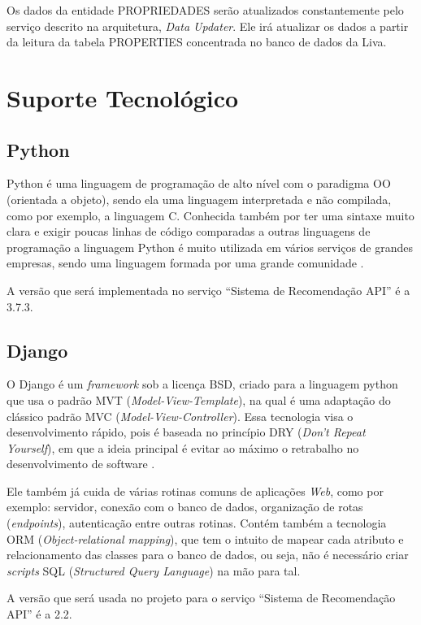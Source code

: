 Os dados da entidade PROPRIEDADES serão atualizados constantemente pelo serviço descrito na arquitetura, \textit{Data Updater}. Ele irá atualizar os dados a partir da leitura da tabela PROPERTIES concentrada no banco de dados da Liva.

\section{Suporte Tecnológico}

\subsection{Python}

Python é uma linguagem de programação de alto nível com o paradigma OO (orientada a objeto), sendo ela uma linguagem interpretada e não compilada, como por exemplo, a linguagem C. Conhecida também por ter uma sintaxe muito clara e exigir poucas linhas de código comparadas a outras linguagens de programação a linguagem Python é muito utilizada em vários serviços de grandes empresas, sendo uma linguagem formada por uma grande comunidade \cite{Python:2019}.

A versão que será implementada no serviço “Sistema de Recomendação API” é a 3.7.3.

\subsection{Django}

O Django é um \textit{framework} sob a licença BSD, criado para a linguagem python que usa o padrão MVT (\textit{Model-View-Template}), na qual é uma adaptação do clássico padrão MVC (\textit{Model-View-Controller}). Essa tecnologia visa o desenvolvimento rápido, pois é baseada no princípio  DRY (\textit{Don’t Repeat Yourself}), em que a ideia principal é evitar ao máximo o retrabalho no desenvolvimento de software \cite{Django:2019}.

Ele também já cuida de várias rotinas comuns de aplicações \textit{Web}, como por exemplo: servidor, conexão com o banco de dados, organização de rotas (\textit{endpoints}), autenticação entre outras rotinas. Contém também a tecnologia ORM (\textit{Object-relational mapping}), que tem o intuito de mapear cada atributo e relacionamento das classes para o banco de dados, ou seja, não é necessário criar \textit{scripts} SQL (\textit{Structured Query Language}) na mão para tal. 

A versão que será usada no projeto para o serviço “Sistema de Recomendação API” é a 2.2.

